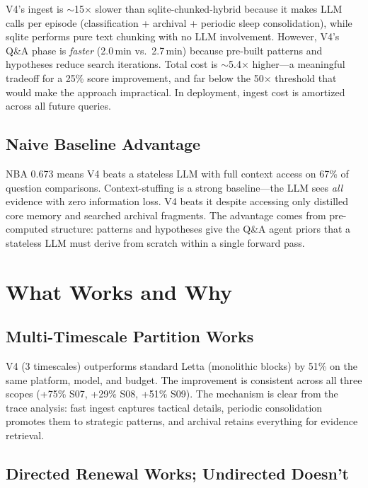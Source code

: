 \documentclass[11pt,letterpaper]{article}
\begin{document}
V4's ingest is $\sim$15$\times$ slower than sqlite-chunked-hybrid because it makes LLM calls per episode (classification + archival + periodic sleep consolidation), while sqlite performs pure text chunking with no LLM involvement. However, V4's Q\&A phase is \emph{faster} (2.0\,min vs.\ 2.7\,min) because pre-built patterns and hypotheses reduce search iterations. Total cost is $\sim$5.4$\times$ higher---a meaningful tradeoff for a 25\% score improvement, and far below the 50$\times$ threshold that would make the approach impractical. In deployment, ingest cost is amortized across all future queries.

\subsection{Naive Baseline Advantage}

NBA 0.673 means V4 beats a stateless LLM with full context access on 67\% of question comparisons. Context-stuffing is a strong baseline---the LLM sees \emph{all} evidence with zero information loss. V4 beats it despite accessing only distilled core memory and searched archival fragments. The advantage comes from pre-computed structure: patterns and hypotheses give the Q\&A agent priors that a stateless LLM must derive from scratch within a single forward pass.

\section{What Works and Why}
\label{sec:discussion}

\subsection{Multi-Timescale Partition Works}

V4 (3 timescales) outperforms standard Letta (monolithic blocks) by 51\% on the same platform, model, and budget. The improvement is consistent across all three scopes (+75\% S07, +29\% S08, +51\% S09). The mechanism is clear from the trace analysis: fast ingest captures tactical details, periodic consolidation promotes them to strategic patterns, and archival retains everything for evidence retrieval.

\subsection{Directed Renewal Works; Undirected Doesn't}
\end{document}
